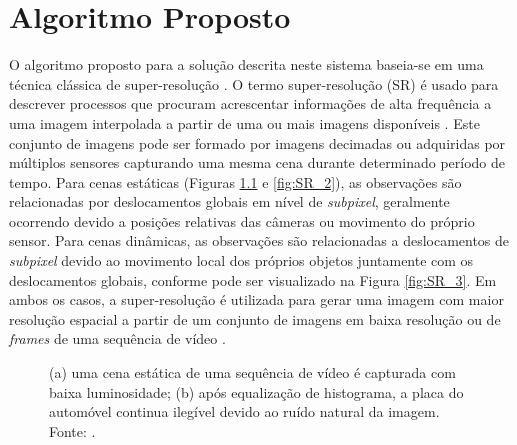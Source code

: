 \chapter[Algoritmo Proposto]{Algoritmo Proposto}

O algoritmo proposto para a solução descrita neste sistema baseia-se em uma técnica clássica de super-resolução \cite{garcia2013tecnicas}. O termo super-resolução (SR) é usado para descrever processos que procuram acrescentar informações de alta frequência a uma imagem interpolada a partir de uma ou mais imagens disponíveis \cite{baker2002limits,park2003super,farsiu2004advances}. Este conjunto de imagens pode ser formado por imagens decimadas ou adquiridas por múltiplos sensores capturando uma mesma cena durante determinado período de tempo. Para cenas estáticas (Figuras \ref{fig:SR_1} e \ref{fig:SR_2}), as observações são relacionadas por deslocamentos globais em nível de \textit{subpixel}, geralmente ocorrendo devido a posições relativas das câmeras ou movimento do próprio sensor. Para cenas dinâmicas, as observações são relacionadas a deslocamentos de \textit{subpixel} devido ao movimento local dos próprios objetos juntamente com os deslocamentos globais, conforme pode ser visualizado na Figura \ref{fig:SR_3}. Em ambos os casos, a super-resolução é utilizada para gerar uma imagem com maior resolução espacial a partir de um conjunto de imagens em baixa resolução ou de \textit{frames} de uma sequência de vídeo \cite{figueira2013super}\cite{milanfar2010super}.
\\

\begin{figure}[h]
    \centering
    \qquad
    \caption{(a) uma cena estática de uma sequência de vídeo é capturada com baixa luminosidade; (b) após equalização de histograma, a placa do automóvel continua ilegível devido ao ruído natural da imagem. Fonte: \cite{kang2000digital}. }%
	    \label{fig:SR_1}
\end{figure}

